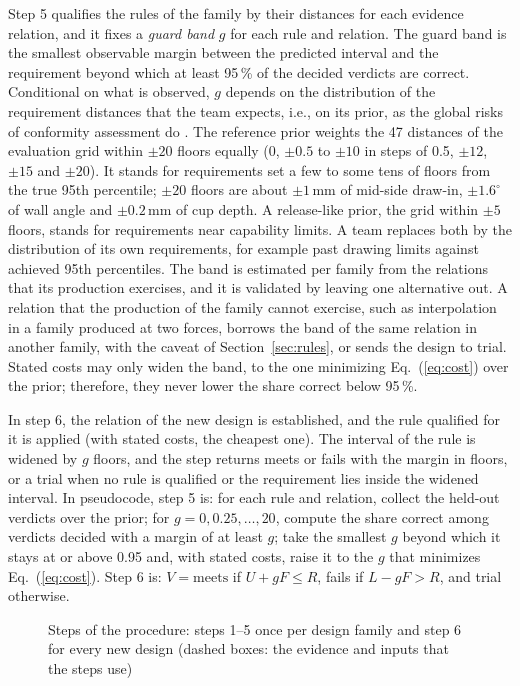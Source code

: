 \documentclass[pdflatex,sn-basic,lineno]{sn-jnl}
\begin{document}
Step 5 qualifies the rules of the family by their distances for each evidence relation, and it fixes a \emph{guard band} $g$ for each rule and relation. The guard band is the smallest observable margin between the predicted interval and the requirement beyond which at least 95\,\% of the decided verdicts are correct. Conditional on what is observed, $g$ depends on the distribution of the requirement distances that the team expects, i.e., on its prior, as the global risks of conformity assessment do \citep{jcgm2012evaluation}. The reference prior weights the 47 distances of the evaluation grid within $\pm20$ floors equally (0, $\pm0.5$ to $\pm10$ in steps of 0.5, $\pm12$, $\pm15$ and $\pm20$). It stands for requirements set a few to some tens of floors from the true 95th percentile; $\pm20$ floors are about $\pm1$\,mm of mid-side draw-in, $\pm1.6^\circ$ of wall angle and $\pm0.2$\,mm of cup depth. A release-like prior, the grid within $\pm5$ floors, stands for requirements near capability limits. A team replaces both by the distribution of its own requirements, for example past drawing limits against achieved 95th percentiles. The band is estimated per family from the relations that its production exercises, and it is validated by leaving one alternative out. A relation that the production of the family cannot exercise, such as interpolation in a family produced at two forces, borrows the band of the same relation in another family, with the caveat of Section~\ref{sec:rules}, or sends the design to trial. Stated costs may only widen the band, to the one minimizing Eq.~(\ref{eq:cost}) over the prior; therefore, they never lower the share correct below 95\,\%.

In step 6, the relation of the new design is established, and the rule qualified for it is applied (with stated costs, the cheapest one). The interval of the rule is widened by $g$ floors, and the step returns meets or fails with the margin in floors, or a trial when no rule is qualified or the requirement lies inside the widened interval. In pseudocode, step 5 is: for each rule and relation, collect the held-out verdicts over the prior; for $g = 0, 0.25, \ldots, 20$, compute the share correct among verdicts decided with a margin of at least $g$; take the smallest $g$ beyond which it stays at or above 0.95 and, with stated costs, raise it to the $g$ that minimizes Eq.~(\ref{eq:cost}). Step 6 is: $V = \text{meets}$ if $U+gF\le R$, fails if $L-gF>R$, and trial otherwise.

\begin{figure}[t]
\centering

\caption{Steps of the procedure: steps 1--5 once per design family and step 6 for every new design (dashed boxes: the evidence and inputs that the steps use)}\label{fig:procedure}
\end{figure}
\end{document}

